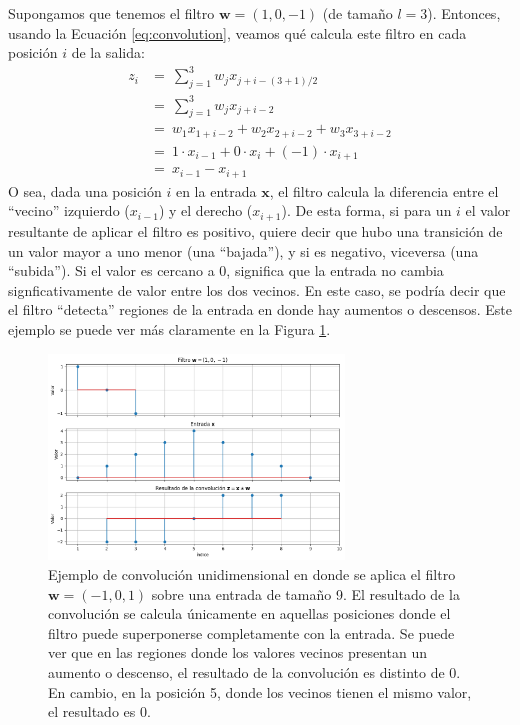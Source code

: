 \documentclass[../../main.tex]{subfiles}
\begin{document}
Supongamos que tenemos el filtro \(\bm{w} = (1, 0, -1)\) (de tamaño \(l=3\)). Entonces,
usando la Ecuación \ref{eq:convolution}, veamos qué calcula este filtro en cada
posición \(i\) de la salida:
\begin{align*}
    z_i &=\ \sum_{j=1}^3 w_j x_{j+i-(3+1)/2} \\
        &=\ \sum_{j=1}^3 w_j x_{j+i-2} \\
        &=\ w_1 x_{1+i-2} + w_2 x_{2+i-2} + w_3 x_{3+i-2} \\
        &=\ 1 \cdot x_{i-1} + 0 \cdot x_i + (-1) \cdot x_{i+1} \\
        &=\ x_{i-1} - x_{i+1}
\end{align*}
O sea, dada una posición \(i\) en la entrada \(\bm{x}\), el filtro calcula la diferencia
entre el ``vecino'' izquierdo (\(x_{i-1}\)) y el derecho (\(x_{i+1}\)). De esta forma, si
para un \(i\) el valor resultante de aplicar el filtro es positivo, quiere decir que hubo
una transición de un valor mayor a uno menor (una ``bajada''), y si es negativo, viceversa
(una ``subida''). Si el valor es cercano a 0, significa que la entrada no cambia
signficativamente de valor entre los dos vecinos. En este caso, se podría decir que el
filtro ``detecta'' regiones de la entrada en donde hay aumentos o descensos. Este ejemplo
se puede ver más claramente en la Figura \ref{fig:conv-example}.

\begin{figure}
    \centering
    \includegraphics[width=0.7\textwidth]{figs/ejemplo_convolucion.png}
    \caption{Ejemplo de convolución unidimensional en donde se aplica el filtro \(\bm{w} =
    (-1,0,1)\) sobre una entrada de tamaño 9. El resultado de la convolución se calcula
    únicamente en aquellas posiciones donde el filtro puede superponerse completamente con
    la entrada. Se puede ver que en las regiones donde los valores vecinos presentan un
    aumento o descenso, el resultado de la convolución es distinto de 0. En cambio, en
    la posición 5, donde los vecinos tienen el mismo valor, el resultado es 0.}
    \label{fig:conv-example}
\end{figure}
\end{document}
